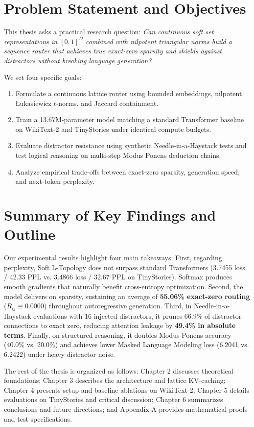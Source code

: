 \section{Problem Statement and Objectives}
This thesis asks a practical research question: \textit{Can continuous soft set representations in $[0, 1]^D$ combined with nilpotent triangular norms build a sequence router that achieves true exact-zero sparsity and shields against distractors without breaking language generation?}

We set four specific goals:
\begin{enumerate}[itemsep=0.5pt, topsep=1.0pt, parsep=0pt]
    \item Formulate a continuous lattice router using bounded embeddings, nilpotent \L{}ukasiewicz $t$-norms, and Jaccard containment.
    \item Train a 13.67M-parameter model matching a standard Transformer baseline on WikiText-2 and TinyStories under identical compute budgets.
    \item Evaluate distractor resistance using synthetic Needle-in-a-Haystack tests and test logical reasoning on multi-step Modus Ponens deduction chains.
    \item Analyze empirical trade-offs between exact-zero sparsity, generation speed, and next-token perplexity.
\end{enumerate}

\section{Summary of Key Findings and Outline}
Our experimental results highlight four main takeaways:
First, regarding perplexity, Soft L-Topology does not surpass standard Transformers (3.7455 loss / 42.33 PPL vs. 3.4866 loss / 32.67 PPL on TinyStories). Softmax produces smooth gradients that naturally benefit cross-entropy optimization.
Second, the model delivers on sparsity, sustaining an average of \textbf{55.06\% exact-zero routing} ($R_{ij} \equiv 0.0000$) throughout autoregressive generation.
Third, in Needle-in-a-Haystack evaluations with 16 injected distractors, it prunes 66.9\% of distractor connections to exact zero, reducing attention leakage by \textbf{49.4\% in absolute terms}.
Finally, on structured reasoning, it doubles Modus Ponens accuracy (40.0\% vs. 20.0\%) and achieves lower Masked Language Modeling loss (6.2041 vs. 6.2422) under heavy distractor noise.

The rest of the thesis is organized as follows: Chapter 2 discusses theoretical foundations; Chapter 3 describes the architecture and lattice KV-caching; Chapter 4 presents setup and baseline ablations on WikiText-2; Chapter 5 details evaluations on TinyStories and critical discussion; Chapter 6 summarizes conclusions and future directions; and Appendix A provides mathematical proofs and test specifications.
